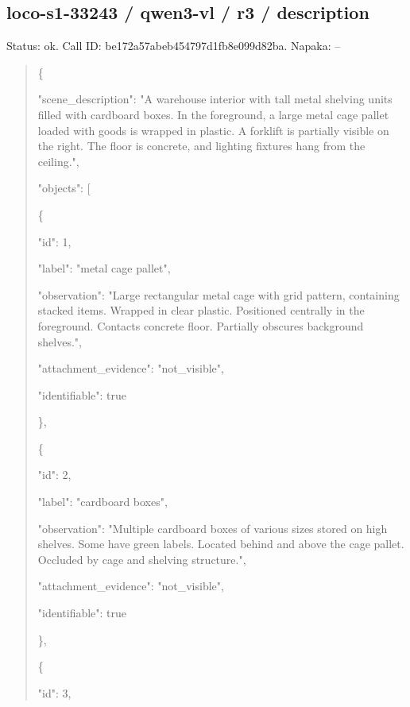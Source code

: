 \documentclass[10pt,a4paper]{article}
\begin{document}
\subsection*{loco-s1-33243 / qwen3-vl / r3 / description}
Status: ok. Call ID: be172a57abeb454797d1fb8e099d82ba. Napaka: --
\begin{quote}\footnotesize
\{\par
  "scene\_description":\allowbreak{} "A warehouse interior with tall metal shelving units filled with cardboard boxes. In the foreground,\allowbreak{} a large metal cage pallet loaded with goods is wrapped in plastic. A forklift is partially visible on the right. The floor is concrete,\allowbreak{} and lighting fixtures hang from the ceiling.",\allowbreak{}\par
  "objects":\allowbreak{} [\par
    \{\par
      "id":\allowbreak{} 1,\allowbreak{}\par
      "label":\allowbreak{} "metal cage pallet",\allowbreak{}\par
      "observation":\allowbreak{} "Large rectangular metal cage with grid pattern,\allowbreak{} containing stacked items. Wrapped in clear plastic. Positioned centrally in the foreground. Contacts concrete floor. Partially obscures background shelves.",\allowbreak{}\par
      "attachment\_evidence":\allowbreak{} "not\_visible",\allowbreak{}\par
      "identifiable":\allowbreak{} true\par
    \},\allowbreak{}\par
    \{\par
      "id":\allowbreak{} 2,\allowbreak{}\par
      "label":\allowbreak{} "cardboard boxes",\allowbreak{}\par
      "observation":\allowbreak{} "Multiple cardboard boxes of various sizes stored on high shelves. Some have green labels. Located behind and above the cage pallet. Occluded by cage and shelving structure.",\allowbreak{}\par
      "attachment\_evidence":\allowbreak{} "not\_visible",\allowbreak{}\par
      "identifiable":\allowbreak{} true\par
    \},\allowbreak{}\par
    \{\par
      "id":\allowbreak{} 3,\allowbreak{}\par

\end{quote}
\end{document}

